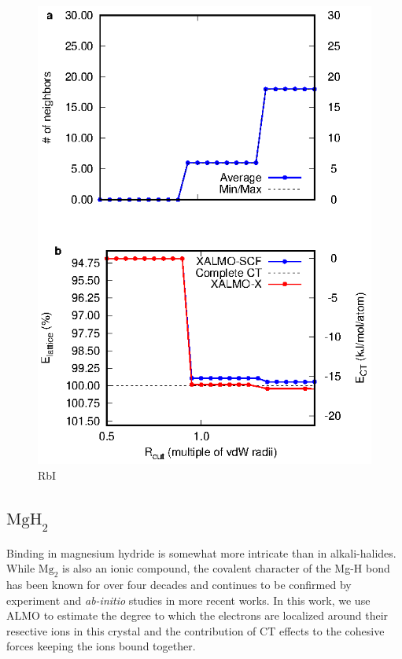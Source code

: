 \documentclass[aps,prb,twocolumn,amsmath,amssymb,superscriptaddress,longbibliography]{revtex4-1}
\begin{document}
\begin{figure}
\includegraphics[scale=1]{./plots/RbI_EvR}
\caption{RbI}
\label{rbi}
\end{figure}






\subsection*{ $\text{MgH}_{2}$ }

Binding in magnesium hydride is somewhat more intricate than in alkali-halides. While $\text{Mg}_{2}$ is also an ionic compound, the covalent character of the Mg-H bond has been known for over four decades and continues to be confirmed by experiment and \emph{ab-initio} studies in more recent works. In this work, we use ALMO to estimate the degree to which the electrons are localized around their resective ions in this crystal and the contribution of CT effects to the cohesive forces keeping the ions bound together.    
\end{document}
